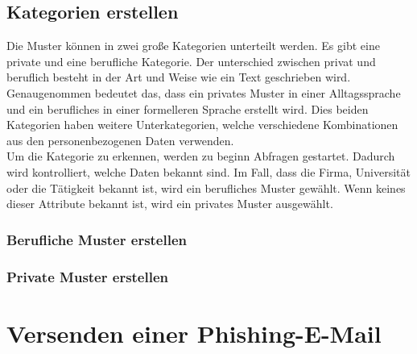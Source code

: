 	\subsection{Kategorien erstellen}
	Die Muster können in zwei große Kategorien unterteilt werden. Es gibt eine private und eine berufliche Kategorie. Der unterschied zwischen privat und beruflich besteht in der Art und Weise wie ein Text geschrieben wird. Genaugenommen bedeutet das, dass ein privates Muster in einer Alltagssprache und ein berufliches in einer formelleren Sprache erstellt wird. Dies beiden Kategorien haben weitere Unterkategorien, welche verschiedene Kombinationen aus den personenbezogenen Daten verwenden.\\
	Um die Kategorie zu erkennen, werden zu beginn Abfragen gestartet. Dadurch wird kontrolliert, welche Daten bekannt sind. Im Fall, dass die Firma, Universität oder die Tätigkeit bekannt ist, wird ein berufliches Muster gewählt. Wenn keines dieser Attribute bekannt ist, wird ein privates Muster ausgewählt.
		\subsubsection{Berufliche Muster erstellen}
		
		\subsubsection{Private Muster erstellen}

\section{Versenden einer Phishing-E-Mail}


	